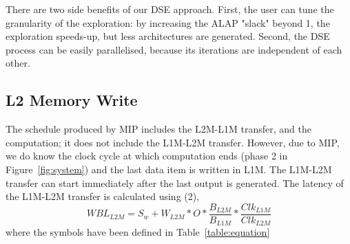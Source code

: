 There are two side benefits of our DSE approach. First, the user can tune the granularity of the exploration: by increasing the ALAP "slack" beyond 1, the exploration speeds-up, but less architectures are generated. Second, the DSE process can be easily parallelised, because its iterations are independent of each other.


\subsection{L2 Memory Write}
The schedule produced by MIP includes the L2M-L1M transfer, and the computation; it does not include the L1M-L2M transfer. However, due to MIP, we do know the clock cycle at which computation ends (phase 2 in Figure~\ref{fig:system}) and the last data item is written in L1M. The L1M-L2M transfer can start immediately after the last output is generated.
The latency of the L1M-L2M transfer is calculated using (2),
\begin{equation}
    WBL_{L2M} = S_w + W_{L2M} * O * \frac{B_{L2M}}{B_{L1M}} * \frac{Clk_{L1M}}{Clk_{L2M}}
\end{equation}
where the symbols have been defined in Table~\ref{table:equation}

